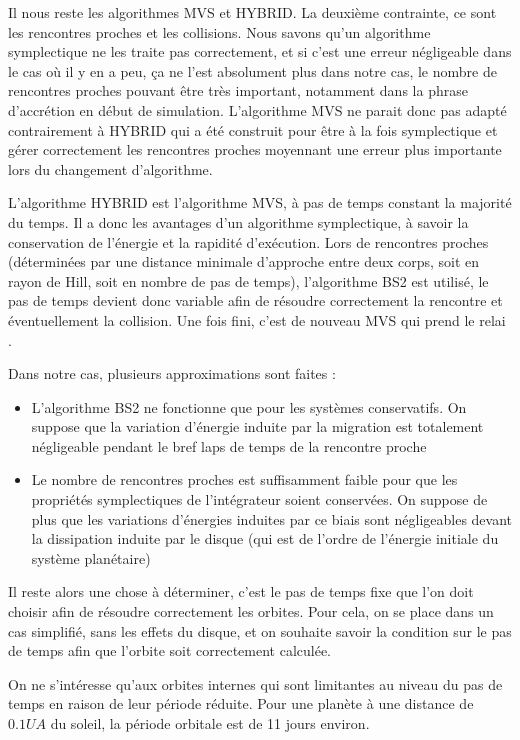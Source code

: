 Il nous reste les algorithmes MVS et HYBRID. La deuxième contrainte, ce sont les rencontres proches et les collisions. Nous savons qu'un algorithme symplectique ne les traite pas correctement, et si c'est une erreur négligeable dans le cas où il y en a peu, ça ne l'est absolument plus dans notre cas, le nombre de rencontres proches pouvant être très important, notamment dans la phrase d'accrétion en début de simulation. L'algorithme MVS ne parait donc pas adapté contrairement à HYBRID qui a été construit pour être à la fois symplectique et gérer correctement les rencontres proches moyennant une erreur plus importante lors du changement d'algorithme. 

L'algorithme HYBRID est l'algorithme MVS, à pas de temps constant la majorité du temps. Il a donc les avantages d'un algorithme symplectique, à savoir la conservation de l'énergie et la rapidité d'exécution. Lors de rencontres proches (déterminées par une distance minimale d'approche entre deux corps, soit en rayon de Hill, soit en nombre de pas de temps), l'algorithme BS2 est utilisé, le pas de temps devient donc variable afin de résoudre correctement la rencontre et éventuellement la collision. Une fois fini, c'est de nouveau MVS qui prend le relai \citep[voir aussi ][]{mcneil2009new}. 

Dans notre cas, plusieurs approximations sont faites : 
\begin{itemize}
\item L'algorithme BS2 ne fonctionne que pour les systèmes conservatifs. On suppose que la variation d'énergie induite par la migration est totalement négligeable pendant le bref laps de temps de la rencontre proche
\item Le nombre de rencontres proches est suffisamment faible pour que les propriétés symplectiques de l'intégrateur soient 
conservées. On suppose de plus que les variations d'énergies induites par ce biais sont négligeables devant la dissipation 
induite par le disque (qui est de l'ordre de l'énergie initiale du système planétaire)
\end{itemize}

Il reste alors une chose à déterminer, c'est le pas de temps fixe que l'on doit choisir afin de résoudre correctement les orbites. Pour cela, on se place dans un cas simplifié, sans les effets du disque, et on souhaite savoir la condition sur le pas de temps afin que l'orbite soit correctement calculée. 

On ne s'intéresse qu'aux orbites internes qui sont limitantes au niveau du pas de temps en raison de leur période réduite. Pour une planète à une distance de $0.1\unit{UA}$ du soleil, la période orbitale est de 11 jours environ.

